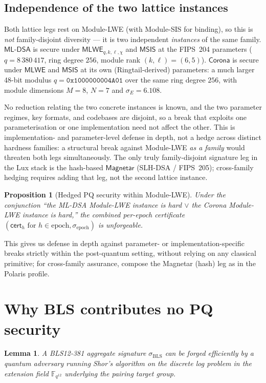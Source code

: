 \documentclass[11pt]{article}
\newtheorem{lemma}[theorem]{Lemma}
\newtheorem{proposition}[theorem]{Proposition}
\begin{document}
\subsection{Independence of the two lattice instances}

Both lattice legs rest on Module-LWE (with Module-SIS for binding), so
this is \emph{not} family-disjoint diversity --- it is two independent
\emph{instances} of the same family.
$\mathsf{ML\text{-}DSA}$ is secure under $\mathsf{MLWE}_{q,k,\ell,\chi}$
and $\mathsf{MSIS}$ at the FIPS~204 parameters
($q = 8\,380\,417$, ring degree $256$, module rank $(k,\ell) = (6,5)$).
$\mathsf{Corona}$ is secure under $\mathsf{MLWE}$ and $\mathsf{MSIS}$ at
its own (Ringtail-derived) parameters: a much larger 48-bit modulus
$q = \mathtt{0x1000000004A01}$ over the same ring degree $256$, with
module dimensions $M=8$, $N=7$ and $\sigma_E = 6.108$.

No reduction relating the two concrete instances is known, and the two
parameter regimes, key formats, and codebases are disjoint, so a break
that exploits one parameterisation or one implementation need not affect
the other. This is implementation- and parameter-level defense in depth,
not a hedge across distinct hardness families: a structural break against
Module-LWE \emph{as a family} would threaten both legs simultaneously.
The only truly family-disjoint signature leg in the Lux stack is the
hash-based $\mathsf{Magnetar}$ (SLH-DSA / FIPS~205); cross-family hedging
requires adding that leg, not the second lattice instance.

\begin{proposition}[Hedged PQ security within Module-LWE]
Under the conjunction ``the ML-DSA Module-LWE instance is hard $\lor$
the Corona Module-LWE instance is hard,'' the combined per-epoch
certificate
$(\textsf{cert}_h \text{ for } h \in \text{epoch}, \sigma_{\text{epoch}})$
is unforgeable.
\end{proposition}

This gives us defense in depth against parameter- or implementation-specific
breaks strictly within the post-quantum setting, without relying on any
classical primitive; for cross-family assurance, compose the Magnetar
(hash) leg as in the Polaris profile.

\section{Why BLS contributes no PQ security}

\begin{lemma}
A BLS12-381 aggregate signature $\sigma_{\text{BLS}}$ can be forged
efficiently by a quantum adversary running Shor's algorithm on the
discrete log problem in the extension field $\mathbb{F}_{q^{12}}$
underlying the pairing target group.
\end{lemma}
\end{document}
